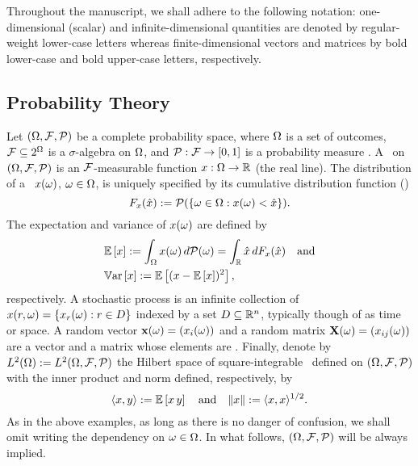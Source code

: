 Throughout the manuscript, we shall adhere to the following notation: one-dimensional (scalar) and infinite-dimensional quantities are denoted by regular-weight lower-case letters whereas finite-dimensional vectors and matrices by bold lower-case and bold upper-case letters, respectively.

\subsection{Probability Theory}
Let $(\Omega, \mathcal{F}, \mathcal{P})$ be a complete probability space, where $\Omega$ is a set of outcomes, $\mathcal{F} \subseteq 2^\Omega$ is a $\sigma$-algebra on $\Omega$, and $\mathcal{P}: \mathcal{F} \to [0, 1]$ is a probability measure \cite{maitre2010}.
A \rv\ on $(\Omega, \mathcal{F}, \mathcal{P})$ is an $\mathcal{F}$-measurable function $x: \Omega \to \mathbb{R}$ (the real line).
The distribution of a \rv\ $x(\omega)$, $\omega \in \Omega$, is uniquely specified by its cumulative distribution function (\cdf)
\begin{equation*}
  F_x(\hat{x}) := \mathcal{P}(\{ \omega \in \Omega: x(\omega) < \hat{x} \}).
\end{equation*}
The expectation and variance of $x(\omega)$ are defined by
\begin{align*}
  & \mathbb{E}\left[ x \right] := \int_\Omega x(\omega) \, d\mathcal{P}(\omega) = \int_{\mathbb{R}} \hat{x} \, d F_x(\hat{x}) \hspace{1em} \text{and} \\
  & \mathbb{V}\text{ar}\left[ x \right] := \mathbb{E}\left[ (x - \mathbb{E}\left[ x \right])^2 \right],
\end{align*}
respectively.
A stochastic process is an infinite collection of \rvs\ $x(r, \omega) = \{ x_r(\omega): r \in D \}$ indexed by a set $D \subseteq \mathbb{R}^n$, typically though of as time or space.
A random vector $\mathbf{x}(\omega) = (x_i(\omega))$ and a random matrix $\mathbf{X}(\omega) = (x_{ij}(\omega))$ are a vector and a matrix whose elements are \rvs.
Finally, denote by $L^{2}(\Omega) := L^{2}(\Omega, \mathcal{F}, \mathcal{P})$ the Hilbert space of square-integrable \rvs\ defined on $(\Omega, \mathcal{F}, \mathcal{P})$ with the inner product and norm defined, respectively, by
\begin{equation*}
  \langle x, y \rangle := \mathbb{E}\left[ x \, y \right] \hspace{1em} \text{and} \hspace{1em} \| x \| := \langle x, x \rangle^{1/2}.
\end{equation*}
As in the above examples, as long as there is no danger of confusion, we shall omit writing the dependency on $\omega \in \Omega$.
In what follows, $(\Omega, \mathcal{F}, \mathcal{P})$ will be always implied.

